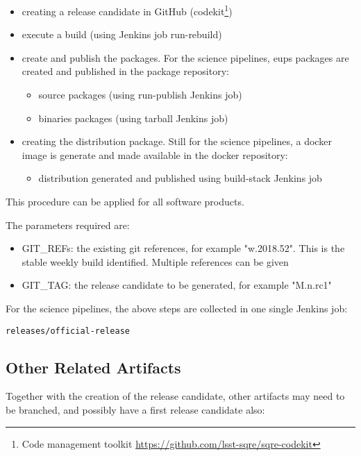 \begin{itemize}
\item creating a release candidate in GitHub (codekit\footnote{Code management toolkit \url{https://github.com/lsst-sqre/sqre-codekit}})
\item execute a build (using Jenkins job run-rebuild)
\item create and publish the packages. For the science pipelines, eups packages are created and published in the package repository:
   \begin{itemize}
   \item source packages (using run-publish Jenkins job)
   \item binaries packages (using tarball Jenkins job)
   \end{itemize}
\item creating the distribution package. Still for the science pipelines, a docker image is generate and made available in the docker repository:
   \begin{itemize}
   \item distribution generated and published using build-stack Jenkins job
   \end{itemize}
\end{itemize}


This procedure can be applied for all software products.

The parameters required are:
\begin{itemize}
\item GIT\_REFs: the existing git references, for example "w.2018.52". This is the stable weekly build identified. Multiple references can be given
\item GIT\_TAG: the release candidate to be generated, for example "M.n.rc1"
\end{itemize}

For the science pipelines, the above steps are collected in one single Jenkins job:
 
\begin{verbatim}
releases/official-release
\end{verbatim}


\subsection{Other Related Artifacts}

Together with the creation of the release candidate, other artifacts may need to be branched, and possibly have a first release candidate also:

